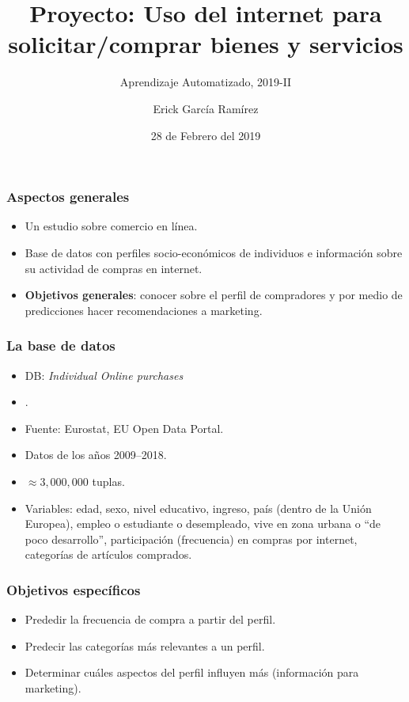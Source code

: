 \documentclass{beamer}
\title{Proyecto: Uso del internet para solicitar/comprar bienes y servicios}
\subtitle{Aprendizaje Automatizado, 2019-II}
\author{Erick García Ramírez}
\institute{MCIC--IIMAS, UNAM}
\date{28 de Febrero del 2019}
\begin{document}
\begin{frame}
\maketitle
\end{frame}
\begin{frame}
    \frametitle{Aspectos generales}
    \begin{itemize}
        \item Un estudio sobre comercio en línea. 
        \item Base de datos con perfiles socio-económicos de individuos e información sobre su actividad de
            compras en internet. 
        \item {\bf Objetivos generales}: conocer sobre el perfil de compradores y por medio de predicciones
            hacer recomendaciones a marketing. 
        \end{itemize}
\end{frame} 

\begin{frame}
    \frametitle{La base de datos} 
    \begin{itemize}
        \item DB: \emph{Individual Online purchases}
        \item {}. 
        \item Fuente: Eurostat, EU Open Data Portal. 
        \item Datos de los años 2009--2018.
        \item $\approx 3,000,000$ tuplas. 
        \item Variables: edad, sexo, nivel educativo, ingreso, país (dentro de la Unión Europea), empleo o
            estudiante o
            desempleado, vive en zona urbana o  ``de poco desarrollo'', participación (frecuencia) en 
            compras por internet, categorías de artículos comprados.
    \end{itemize}
\end{frame}
\begin{frame}
    \frametitle{Objetivos específicos}
    \begin{itemize}
        \item Prededir la frecuencia de compra a partir del perfil.
        \item Predecir las categorías más relevantes a un perfil.  
        \item Determinar cuáles aspectos del perfil influyen más (información para marketing).  
        \end{itemize}
\end{frame} 
\end{document}
